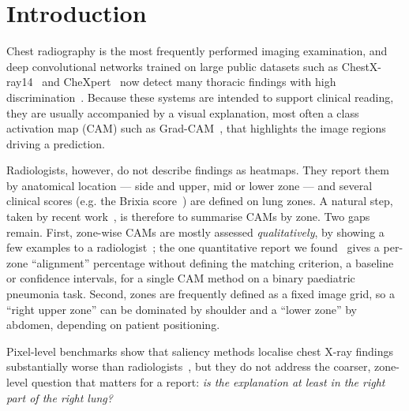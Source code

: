 \documentclass[pdflatex,sn-mathphys-num]{sn-jnl}
\begin{document}

\maketitle

\section{Introduction}\label{sec:intro}

Chest radiography is the most frequently performed imaging examination, and deep convolutional networks trained on large public datasets such as ChestX-ray14~\cite{wang2017chestxray8} and CheXpert~\cite{irvin2019chexpert} now detect many thoracic findings with high discrimination~\cite{rajpurkar2017chexnet}. Because these systems are intended to support clinical reading, they are usually accompanied by a visual explanation, most often a class activation map (CAM) such as Grad-CAM~\cite{selvaraju2017gradcam}, that highlights the image regions driving a prediction.

Radiologists, however, do not describe findings as heatmaps. They report them by anatomical location --- side and upper, mid or lower zone --- and several clinical scores (e.g. the Brixia score~\cite{borghesi2020brixia}) are defined on lung zones. A natural step, taken by recent work~\cite{tbzones2023scirep,zoneaware2026pneumonia}, is therefore to summarise CAMs by zone. Two gaps remain. First, zone-wise CAMs are mostly assessed \emph{qualitatively}, by showing a few examples to a radiologist~\cite{tbzones2023scirep}; the one quantitative report we found~\cite{zoneaware2026pneumonia} gives a per-zone ``alignment'' percentage without defining the matching criterion, a baseline or confidence intervals, for a single CAM method on a binary paediatric pneumonia task. Second, zones are frequently defined as a fixed image grid, so a ``right upper zone'' can be dominated by shoulder and a ``lower zone'' by abdomen, depending on patient positioning.

Pixel-level benchmarks show that saliency methods localise chest X-ray findings substantially worse than radiologists~\cite{saporta2022benchmarking,arun2021trustworthiness}, but they do not address the coarser, zone-level question that matters for a report: \emph{is the explanation at least in the right part of the right lung?}
\end{document}
